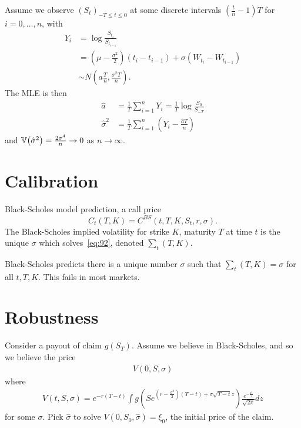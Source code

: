 Assume we observe $(S_{t})_{-T \leq t \leq 0}$ at some discrete intervals $(\frac{t}{n} -
1)T$ for $i = 0, \dots, n$, with 
\begin{align}
  \label{eq:156}
  Y_{i} &= \log \frac{S_{t_{i}}}{S_{t_{i-1}}} \\
  &= (\mu - \frac{\sigma^{2}}{2})(t_{i} - t_{i-1}) + \sigma(W_{t_{i}}
  - W_{t_{i-1}}) \\
  &\sim N(a\frac{T}{n}, \frac{\sigma^{2}T}{n}).
\end{align}
 The MLE is then
\begin{align}
  \label{eq:91}
  \hat a &= \frac{1}{T} \sum_{i=1}^{n} Y_{i} = \frac{1}{T} \log \frac{S_{0}}{S_{-T}} \\
  \hat \sigma^{2} &= \frac{1}{T} \sum_{i=1}^{n} (Y_{i} - \frac{\hat a
    T}{n})
\end{align} and $\Var{\hat \sigma^{2}} = \frac{2\sigma^{4}}{n}
\rightarrow 0$ as $n \rightarrow \infty$.

\section{Calibration}
\label{sec:calibration}

Black-Scholes model prediction, a call price 
\begin{equation}
  \label{eq:92}
  C_{t}(T, K) = C^{BS}(t, T, K, S_{t}, r, \sigma).
\end{equation}
The Black-Scholes implied volatility for strike $K$, maturity $T$ at
time $t$ is the unique $\sigma$ which solves~\eqref{eq:92}, denoted
$\sum_{t}(T, K)$.

Black-Scholes predicts there is a unique number $\sigma$ such that
$\sum_{t}(T, K) = \sigma$ for all $t, T, K$.  This fails in most
markets.

\section{Robustness}
\label{sec:robustness}

Consider a payout of claim $g(S_{T})$.  Assume we believe in
Black-Scholes, and so we believe the price
\begin{align}
  \label{eq:93}
  V(0, S, \sigma)
\end{align} where
\begin{align}
  \label{eq:94}
  V(t, S, \sigma) = e^{-r(T-t)} \int
  g(Se^{(r-\frac{\sigma^{2}}{2})(T-t) + \sigma \sqrt{T-t}z})
  \frac{e^{-\frac{z^{2}}{2}}}{\sqrt{2 \pi}} dz
\end{align} for some $\sigma$.  Pick $\hat \sigma$ to solve $V(0,
S_{0}, \hat \sigma) = \xi_{0}$, the initial price of the claim.

